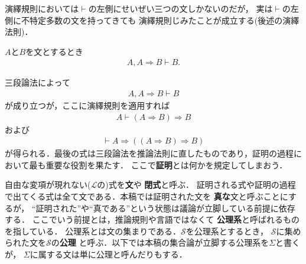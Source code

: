 	演繹規則においては$\vdash$の左側にせいぜい三つの文しかないのだが，
	実は$\vdash$の左側に不特定多数の文を持ってきても
	演繹規則じみたことが成立する(後述の演繹法則)．
	
	\begin{screen}
		\begin{logicalaxm}[三段論法]
			$A$と$B$を文とするとき
			\begin{align}
				A,A \Longrightarrow B \vdash B.
			\end{align}
		\end{logicalaxm}
	\end{screen}
	
	三段論法によって
	\begin{align}
		A,A \Longrightarrow B \vdash B
	\end{align}
	が成り立つが，ここに演繹規則を適用すれば
	\begin{align}
		A \vdash (A \Longrightarrow B) \Longrightarrow B
	\end{align}
	および
	\begin{align}
		\vdash A \Longrightarrow ((A \Longrightarrow B) \Longrightarrow B)
	\end{align}
	が得られる．最後の式は三段論法を推論法則に直したものであり，証明の過程において最も重要な役割を果たす．
	ここで{\bf 証明}とは何かを規定してしまおう．
	
	自由な変項が現れない($\mathcal{L}$の)式を{\bf 文}や
	{\bf 閉式}と呼ぶ．
	証明される式や証明の過程で出てくる式は全て文である．本稿では証明された文を
	{\bf 真な}文と呼ぶことにするが，
	``証明された''や``真である''という状態は議論が立脚している前提に依存する．
	ここでいう前提とは，推論規則や言語ではなくて
	{\bf 公理系}と呼ばれるものを指している．
	公理系とは文の集まりである．$\mathscr{S}$を公理系とするとき，
	$\mathscr{S}$に集められた文を$\mathscr{S}$の{\bf 公理}
	と呼ぶ．以下では本稿の集合論が立脚する公理系を$\Sigma$と書くが，
	$\Sigma$に属する文は単に公理と呼んだりもする．
	

